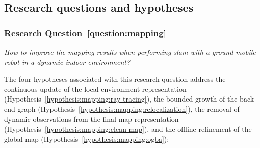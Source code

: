\subsection{Research questions and hypotheses}\label{sec:conclusions:rq+h}

\subsubsection{Research Question~\ref{question:mapping}}

\emph{How to improve the mapping results when performing \gls{slam} with a
ground mobile robot in a dynamic indoor environment?}

The four hypotheses associated with this research question address the
continuous update of the local environment representation
(Hypothesis~\ref{hypothesis:mapping:ray-tracing}), the bounded growth of the
back-end graph (Hypothesis~\ref{hypothesis:mapping:relocalization}),
the removal of dynamic observations from the final map representation
(Hypothesis~\ref{hypothesis:mapping:clean-map}), and the offline refinement
of the global map (Hypothesis~\ref{hypothesis:mapping:ogba}):
